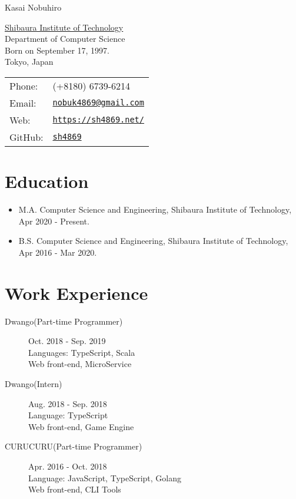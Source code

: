 \documentclass[letterpaper]{article}
\def\name{Kasai Nobuhiro}
\begin{document}
{\huge \name}


\vspace{0.25in}

\begin{minipage}{0.45\linewidth}
  \href{https://www.shibaura-it.ac.jp/}{Shibaura Institute of Technology} \\
  Department of Computer Science \\
  Born on September 17, 1997. \\
  Tokyo, Japan
\end{minipage}
\begin{minipage}{0.45\linewidth}
  \begin{tabular}{ll}
    Phone: & (+8180) 6739-6214 \\
    Email: & \href{mailto:nobuk4869@gmail.com}{\tt nobuk4869@gmail.com} \\
    Web: & \href{https://sh4869.net}{\tt https://sh4869.net/} \\
    GitHub: & \href{https://github.com/sh4869}{\tt sh4869} \\
  \end{tabular}
\end{minipage}

\section*{Education}

\begin{itemize}
    \item M.A. Computer Science and Engineering, Shibaura Institute of Technology, Apr 2020 - Present.
    \item B.S. Computer Science and Engineering, Shibaura Institute of Technology, Apr 2016 - Mar 2020.
\end{itemize}

\section*{Work Experience}
\begin{description}
    \item[Dwango(Part-time Programmer)]Oct. 2018 - Sep. 2019\\
    Languages: TypeScript, Scala \\
    Web front-end, MicroService 
    \item[Dwango(Intern)]Aug. 2018 - Sep. 2018\\ 
    Language: TypeScript \\
    Web front-end, Game Engine
    \item[CURUCURU(Part-time Programmer)]Apr. 2016 - Oct. 2018\\
    Language: JavaScript, TypeScript, Golang \\
    Web front-end, CLI Tools
\end{description}
\end{document}
